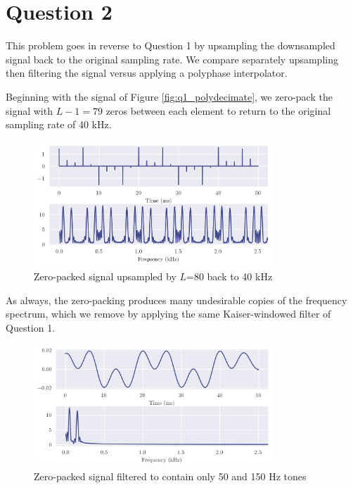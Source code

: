 \section*{Question 2}

This problem goes in reverse to Question 1 by upsampling the downsampled signal back to the original sampling rate. We compare separately upsampling then filtering the signal versus applying a polyphase interpolator.

Beginning with the signal of Figure \ref{fig:q1_polydecimate}, we zero-pack the signal with $L-1=79$ zeros between each element to return to the original sampling rate of 40 kHz.

\begin{figure}[ht]
    \centering
    \includegraphics[width=0.8\textwidth]{images/q2_zpack.png}
    \caption{Zero-packed signal upsampled by $L$=80 back to 40 kHz}
    \label{fig:q2_zpack}
\end{figure}

As always, the zero-packing produces many undesirable copies of the frequency spectrum, which we remove by applying the same Kaiser-windowed filter of Question 1.

\begin{figure}[ht]
    \centering
    \includegraphics[width=0.8\textwidth]{images/q2_usamp.png}
    \caption{Zero-packed signal filtered to contain only 50 and 150 Hz tones}
\end{figure}

